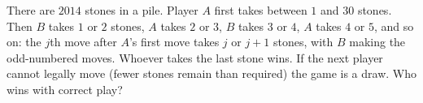 There are $2014$ stones in a pile. Player $A$ first takes between $1$ and $30$ stones. Then $B$ takes $1$ or $2$ stones, $A$ takes $2$ or $3$, $B$ takes $3$ or $4$, $A$ takes $4$ or $5$, and so on: the $j$th move after $A$'s first move takes $j$ or $j+1$ stones, with $B$ making the odd-numbered moves. Whoever takes the last stone wins. If the next player cannot legally move (fewer stones remain than required) the game is a draw. Who wins with correct play?
